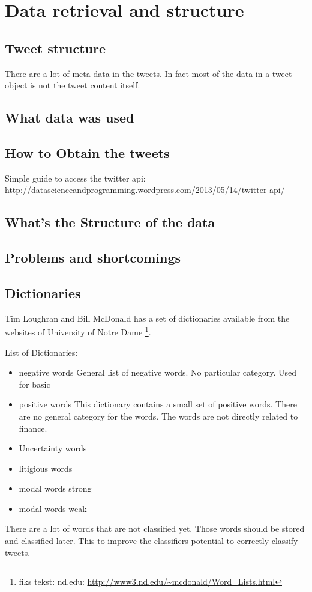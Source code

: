 \chapter{Data retrieval and structure}

\section{Tweet structure}
There are a lot of meta data in the tweets. In fact most of the data in a tweet
object is not the tweet content itself. 

\section{What data was used}
\section{How to Obtain the tweets}
Simple guide to access the twitter api:  http://datascienceandprogramming.wordpress.com/2013/05/14/twitter-api/

\section{What's the Structure of the data}
\section{Problems and shortcomings}

\section{Dictionaries}\label{sec:dict}

Tim Loughran and Bill McDonald has a set of dictionaries available from the
websites of University of Notre Dame \footnote{fiks tekst: nd.edu:
\url{http://www3.nd.edu/~mcdonald/Word_Lists.html}}. 

List of Dictionaries:
\begin{itemize}
    \item negative words
General list of negative words. No particular category. Used for basic   
    \item positive words
This dictionary contains a small set of positive words. There are no general
category for the words. The words are not directly related to finance. 
    \item Uncertainty words
    \item litigious words
    \item modal words strong
    \item modal words weak
\end{itemize}

There are a lot of words that are not classified yet. Those words should be
stored and classified later. This to improve the classifiers potential to
correctly classify tweets.  

